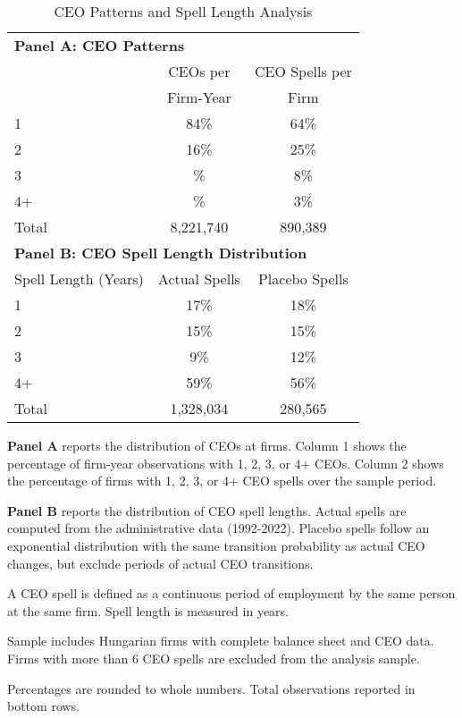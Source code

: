 \begin{table}[htbp]
\centering
\caption{CEO Patterns and Spell Length Analysis}
\label{tab:ceo_patterns}
\begin{threeparttable}
\begin{tabular}{lcc}
\toprule
\multicolumn{3}{l}{\textbf{Panel A: CEO Patterns}} \\
 & CEOs per & CEO Spells per \\
 & Firm-Year & Firm \\
\midrule
1 & 84\% & 64\% \\
2 & 16\% & 25\% \\
3 & \% & 8\% \\
4+ & \% & 3\% \\
Total &    8,221,740 &      890,389 \\
\midrule
\multicolumn{3}{l}{\textbf{Panel B: CEO Spell Length Distribution}} \\
Spell Length (Years) & Actual Spells & Placebo Spells \\
\midrule
1 & 17\% & 18\% \\
2 & 15\% & 15\% \\
3 & 9\% & 12\% \\
4+ & 59\% & 56\% \\
Total &    1,328,034 &      280,565 \\
\bottomrule
\end{tabular}
\begin{tablenotes}[flushleft]
\footnotesize
\item \textbf{Panel A} reports the distribution of CEOs at firms. Column 1 shows the percentage of firm-year observations with 1, 2, 3, or 4+ CEOs. Column 2 shows the percentage of firms with 1, 2, 3, or 4+ CEO spells over the sample period.
\item \textbf{Panel B} reports the distribution of CEO spell lengths. Actual spells are computed from the administrative data (1992-2022). Placebo spells follow an exponential distribution with the same transition probability as actual CEO changes, but exclude periods of actual CEO transitions.
\item A CEO spell is defined as a continuous period of employment by the same person at the same firm. Spell length is measured in years.
\item Sample includes Hungarian firms with complete balance sheet and CEO data. Firms with more than 6 CEO spells are excluded from the analysis sample.
\item Percentages are rounded to whole numbers. Total observations reported in bottom rows.
\end{tablenotes}
\end{threeparttable}
\end{table}
